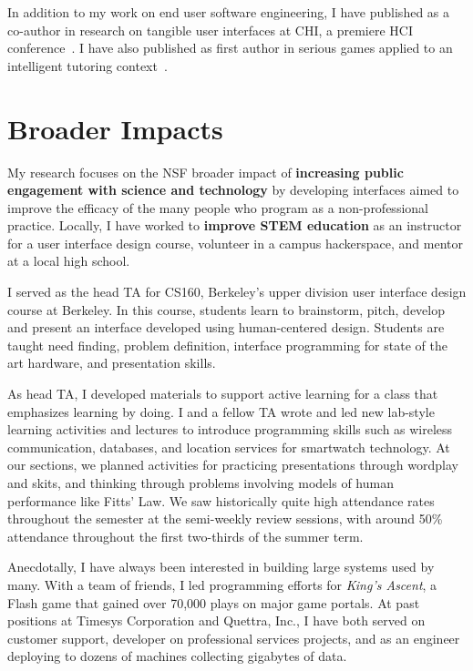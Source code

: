 \documentclass[12pt]{memoir}
\begin{document}
In addition to my work on end user software engineering, I have published as a co-author in research on tangible user interfaces at CHI, a premiere HCI conference~\cite{savage_lamello_2015}.
I have also published as first author in serious games applied to an intelligent tutoring context~\cite{head_tonewars_2014}.

\section{Broader Impacts}

My research focuses on the NSF broader impact of \textbf{increasing public engagement with science and technology} by developing interfaces aimed to improve the efficacy of the many people who program as a non-professional practice.
Locally, I have worked to \textbf{improve STEM education} as an instructor for a user interface design course, volunteer in a campus hackerspace, and mentor at a local high school.

I served as the head TA for CS160, Berkeley's upper division user interface design course at Berkeley.
In this course, students learn to brainstorm, pitch, develop and present an interface developed using human-centered design.
Students are taught need finding, problem definition, interface programming for state of the art hardware, and presentation skills.

As head TA, I developed materials to support active learning for a class that emphasizes learning by doing.
I and a fellow TA wrote and led new lab-style learning activities and lectures to introduce programming skills such as wireless communication, databases, and location services for smartwatch technology.
At our sections, we planned activities for practicing presentations through wordplay and skits, and thinking through problems involving models of human performance like Fitts' Law.
We saw historically quite high attendance rates throughout the semester at the semi-weekly review sessions, with around 50\% attendance throughout the first two-thirds of the summer term.

Anecdotally, I have always been interested in building large systems used by many.
With a team of friends, I led programming efforts for \emph{King's Ascent}, a Flash game that gained over 70,000 plays on major game portals.
At past positions at Timesys Corporation and Quettra, Inc., I have both served on customer support, developer on professional services projects, and as an engineer deploying to dozens of machines collecting gigabytes of data.
\end{document}
